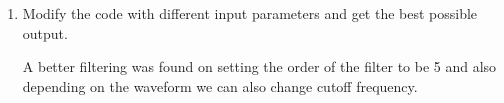 \documentclass[journal,12pt,twocolumn]{IEEEtran}
\theoremstyle{remark}
\begin{document}
\begin{enumerate}[label=\thesection.\arabic*]
																																																																																													    \item
																																																																																													    Modify the code with different input parameters and get the best possible output.

																																																																																													    \solution
																																																																																													    A better filtering was found on setting the order of the filter to be 5 and also depending on the waveform we can also change cutoff frequency.
																																																																																													    \end{enumerate}


																																																																																													    
\end{document}
